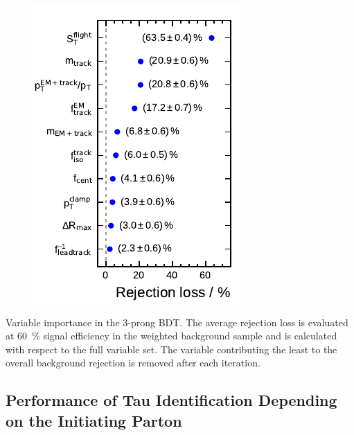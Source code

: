\begin{minipage}{\textwidth}
\begin{subfigure}[t]{0.32\textwidth}
  \end{subfigure}
  \begin{subfigure}[t]{0.32\textwidth}
    \centering
    \includegraphics{./figures/bdt_perf/var_importance/3p_iter3.pdf}
  \end{subfigure}
  \caption[Recursive feature elimination for the 3-prong BDT]{Variable
    importance in the 3-prong BDT. The average rejection loss is evaluated at
    \SI{60}{\percent} signal efficiency in the weighted background sample and is
    calculated with respect to the full variable set. The variable contributing
    the least to the overall background rejection is removed after each
    iteration.}
  \label{fig:variable_importance_3p_app}
\end{minipage}

\FloatBarrier
\subsection{Performance of Tau Identification Depending on the Initiating
  Parton}
\label{app:bdt_parton}

